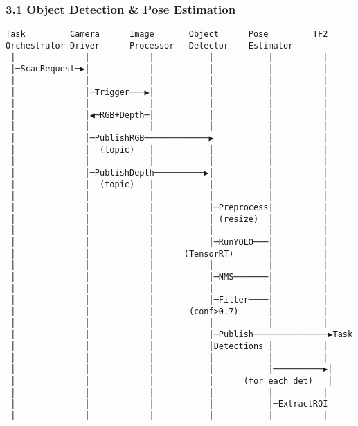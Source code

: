 \documentclass[
]{article}
\begin{document}
\hypertarget{object-detection-pose-estimation}{%
\subsubsection{3.1 Object Detection \& Pose
Estimation}\label{object-detection-pose-estimation}}

\begin{verbatim}
Task         Camera      Image       Object      Pose         TF2
Orchestrator Driver      Processor   Detector    Estimator
 │              │            │           │           │          │
 │─ScanRequest─▶│            │           │           │          │
 │              │            │           │           │          │
 │              │─Trigger───▶│           │           │          │
 │              │            │           │           │          │
 │              │◀─RGB+Depth─│           │           │          │
 │              │            │           │           │          │
 │              │─PublishRGB─────────────▶           │          │
 │              │  (topic)   │           │           │          │
 │              │            │           │           │          │
 │              │─PublishDepth──────────▶│           │          │
 │              │  (topic)   │           │           │          │
 │              │            │           │           │          │
 │              │            │           │─Preprocess│          │
 │              │            │           │ (resize)  │          │
 │              │            │           │           │          │
 │              │            │           │─RunYOLO───│          │
 │              │            │      (TensorRT)       │          │
 │              │            │           │           │          │
 │              │            │           │─NMS───────│          │
 │              │            │           │           │          │
 │              │            │           │─Filter────│          │
 │              │            │       (conf>0.7)      │          │
 │              │            │           │           │          │
 │              │            │           │─Publish───────────────▶Task
 │              │            │           │Detections │          │
 │              │            │           │           │          │
 │              │            │           │           │──────────▶│
 │              │            │           │      (for each det)   │
 │              │            │           │           │          │
 │              │            │           │           │─ExtractROI
 │              │            │           │           │          │

\end{verbatim}
\end{document}
